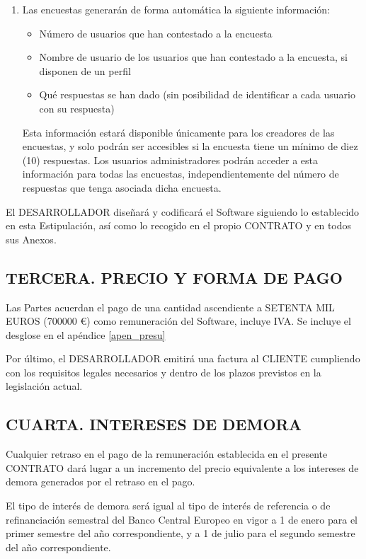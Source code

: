 \documentclass[a4paper,11pt]{report}
\begin{document}
\begin{enumerate}
		\item Las encuestas generarán de forma automática la siguiente información:
			\begin{itemize}
				\item Número de usuarios que han contestado a la encuesta
				\item Nombre de usuario de los usuarios que han contestado a la encuesta,
				si disponen de un perfil
				\item Qué respuestas se han dado (sin posibilidad de identificar
				a cada usuario con su respuesta)
			\end{itemize}
		Esta información estará disponible únicamente para los creadores de las
		encuestas, y solo podrán ser accesibles si la encuesta tiene un mínimo de
		diez (10) respuestas. Los usuarios administradores podrán acceder
		a esta información para todas las encuestas, independientemente del número
		de respuestas que tenga asociada dicha encuesta.
	\end{enumerate}

	El DESARROLLADOR diseñará y codificará el Software siguiendo lo
	establecido en esta Estipulación, así como lo recogido en el propio
	CONTRATO y en todos sus Anexos.

	\subsection*{TERCERA. PRECIO Y FORMA DE PAGO}

	Las Partes acuerdan el pago de una cantidad ascendiente a SETENTA MIL EUROS
	(700000 \euro) como remuneración del Software, incluye IVA.
	Se incluye el desglose en el apéndice \ref{apen_presu}

	Por último, el DESARROLLADOR emitirá una factura al CLIENTE cumpliendo
	con los requisitos legales necesarios y dentro de los plazos previstos
	en la legislación actual.

	\subsection*{CUARTA. INTERESES DE DEMORA}

	Cualquier	retraso en el pago de la remuneración establecida en el presente
	CONTRATO dará lugar a un incremento del precio equivalente a los
	intereses de demora generados por el retraso en el pago.

	El tipo de interés de demora será igual al tipo de interés de referencia
	o de refinanciación semestral del Banco Central Europeo en vigor a 1 de
	enero para el primer semestre del año correspondiente, y a 1 de julio
	para el segundo semestre del año correspondiente.
\end{document}
